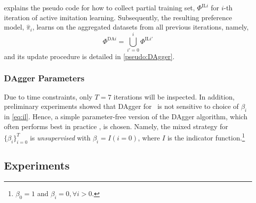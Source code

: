 \documentclass[smallextended]{svjour3}
\begin{document}

 explains the pseudo code for how to collect 
partial training set, $\Phi^{\text{IL}i}$ for $i$-th iteration of active 
imitation learning.
Subsequently, the resulting preference model, $\hat{\pi}_i$, learns on the 
aggregated datasets from all previous iterations, namely,  
\begin{equation}\label{eq:DAgger}
\Phi^{\text{DA}i}=\bigcup_{i'=0}^{i}\Phi^{\text{IL}i'}
\end{equation}
and its update procedure is detailed in \cref{pseudo:DAgger}.

\subsubsection*{DAgger Parameters}
Due to time constraints, only $T=7$ iterations will be inspected.
In addition, preliminary experiments showed that DAgger for \jsp\ is not 
sensitive to choice of $\beta_i$ in \cref{eq:il}. 
Hence, a simple parameter-free version of the DAgger algorithm, which often 
performs best in practice \cite{RossGB11}, is chosen. 
Namely, the mixed strategy for $\{\beta_i\}_{i=0}^T$ is \emph{unsupervised} 
with $\beta_i=I(i=0)$, where $I$ is the indicator 
function.\footnote{$\beta_0=1$ and $\beta_i=0,\forall i>0$.}





\subsection{Experiments}\label{sec:expr}

\end{document}
